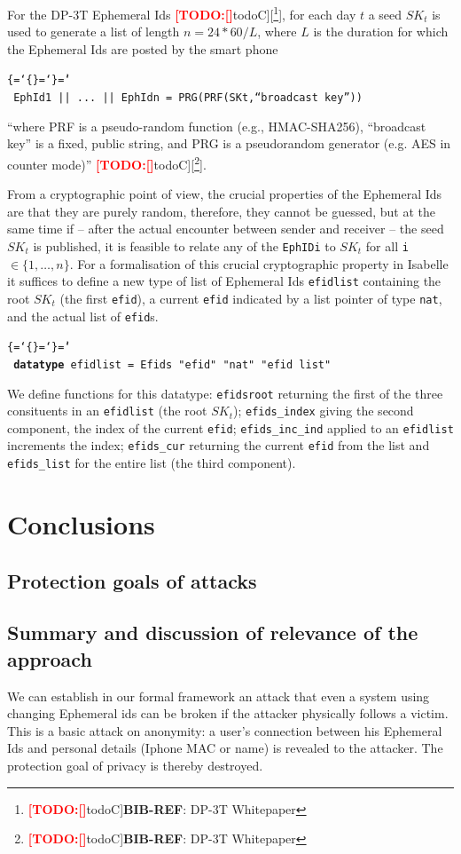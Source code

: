 \documentclass{llncs}
\newenvironment{ttbox}{\begin{alltt}\ttbraces\small\tt}%
                      {\end{alltt}}
\def\ttbraces{\let\.=\nobreak\chardef\{=`\{\chardef\}=`\}\chardef\|=`\\}
\newcommand{\TODO}[1]{\textcolor{red}{\textbf{[TODO:#1]}}}
\newcommand*{\TODOfn}[2][noteC]{\TODO[#1]{[\footnote{\TODO[#1]{#2}}]}}
\newcommand*{\TODOref}[2][todoC]{\TODOfn[#1]{\textbf{BIB-REF}: #2}}
\begin{document}
For the DP-3T Ephemeral Ids \TODOref{DP-3T Whitepaper}, for each day $t$ a seed $SK_t$
is used to generate a list of length $n = 24 * 60 / L$, where $L$ is the duration for which
the Ephemeral Ids are posted by the smart phone
\begin{ttbox}
  EphId1 || ... || EphIdn = PRG(PRF(SKt,``broadcast key''))
\end{ttbox} 
``where PRF is a pseudo-random function (e.g., HMAC-SHA256), ``broadcast key'' is a
fixed, public string, and PRG is a pseudorandom generator (e.g. AES in counter mode)'' \TODOref{DP-3T Whitepaper}.

From a cryptographic point of view, the crucial properties of the Ephemeral Ids are that
they are purely random, therefore, they cannot be guessed, but at the same time if -- after
the actual encounter between sender and receiver -- the seed $SK_t$ is published, it is feasible
to relate any of the \texttt{EphIDi} to $SK_t$  for all \texttt{i} $\in \{1, \ldots, n\}$.
For a formalisation of this crucial cryptographic property in Isabelle it suffices to define a new type
of list of Ephemeral Ids \texttt{efidlist} containing the root $SK_t$ (the first \texttt{efid}),
a current \texttt{efid} indicated by a list pointer of type \texttt{nat}, and the actual list of
\texttt{efid}s.
\begin{ttbox}
{\bf{datatype}} efidlist = Efids "efid" "nat" "efid list"
\end{ttbox}
We define functions for this datatype: \texttt{efidsroot} returning the first of the three
consituents in an \texttt{efidlist} (the root $SK_t$); \texttt{efids\_index} giving the second
component, the index of the current \texttt{efid}; \texttt{efids\_inc\_ind} applied to an
\texttt{efidlist} increments the index; \texttt{efids\_cur} returning the current \texttt{efid}
from the list and \texttt{efids\_list} for the entire list (the third component).



\section{Conclusions}
\label{sec:concl}
\subsection{Protection goals of attacks}

\subsection{Summary and discussion of relevance of the approach}
We can establish in our formal framework an attack that even a system using changing
Ephemeral ids can be broken if the attacker physically follows a victim. This is a basic attack on
anonymity: a user's connection between his Ephemeral Ids and personal details (Iphone MAC or name)
is revealed to the attacker. The protection goal of privacy is thereby destroyed.
\end{document}
